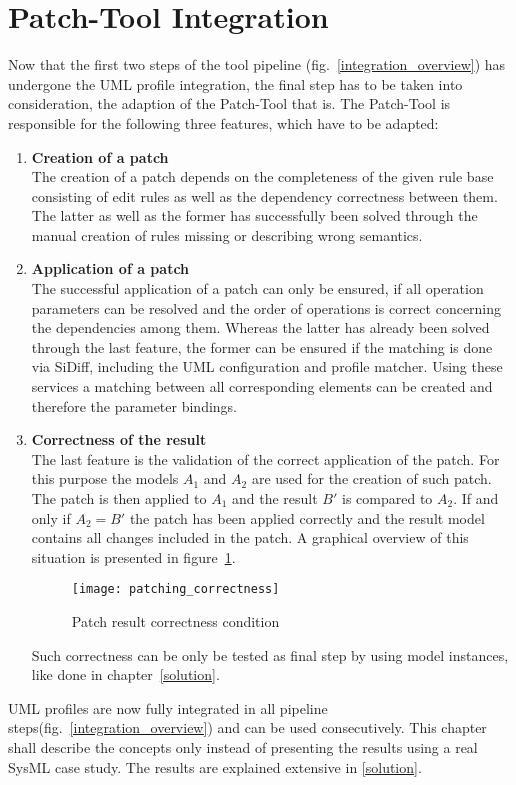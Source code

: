 \section{Patch-Tool Integration}\label{Integration:patchtool}
Now that the first two steps of the tool pipeline
(fig.~\ref{integration_overview}) has undergone the \ac{UML} profile
integration, the final step has to be taken into consideration, the adaption
of the Patch-Tool that is. The Patch-Tool is responsible for the following three
features, which have to be adapted:
\begin{enumerate}
  \item \textbf{Creation of a patch} \\
  		The creation of a patch depends on the completeness of the given rule base
  		consisting of edit rules as well as the dependency correctness between them.
  		The latter as well as the former has successfully been solved through the
  		manual creation of rules missing or describing wrong semantics.
    \item \textbf{Application of a patch} \\
    	The successful application of a patch can only be ensured, if all
    	operation parameters can be resolved and the order of operations is correct
    	concerning the dependencies among them. Whereas the latter has already been
    	solved through the last feature, the former can be ensured if the matching
    	is done via SiDiff, including the \ac{UML} configuration and
    	profile matcher. Using these services a matching between all corresponding
    	elements can be created and therefore the parameter bindings.
    \item \textbf{Correctness of the result} \\
    	The last feature is the validation of the correct application of the patch.
    	For this purpose the models $A_1$ and $A_2$ are used for the creation of
    	such patch. The patch is then applied to $A_1$ and the result $B'$ is
    	compared to $A_2$. If and only if $A_2 = B'$ the patch has been applied
    	correctly and the result model contains all changes included in the patch.
    	A graphical overview of this situation is presented in figure~\ref{patch_correctness}.
		\begin{figure}[h!]
		\begin{center}
		\texttt{[image: patching\_correctness]}\\
		\end{center}
		\caption{Patch result correctness condition}
		\label{patch_correctness}
		\end{figure}
		
		Such correctness can be only be tested as final step by using model instances,
		like done in chapter~\ref{solution}.
\end{enumerate}
 
\ac{UML} profiles are now fully integrated in all pipeline
steps(fig.~\ref{integration_overview}) and can be used consecutively. 
This chapter shall describe the concepts only instead of presenting the results
using a real \ac{SysML} case study. The results are explained extensive in
\ref{solution}.


